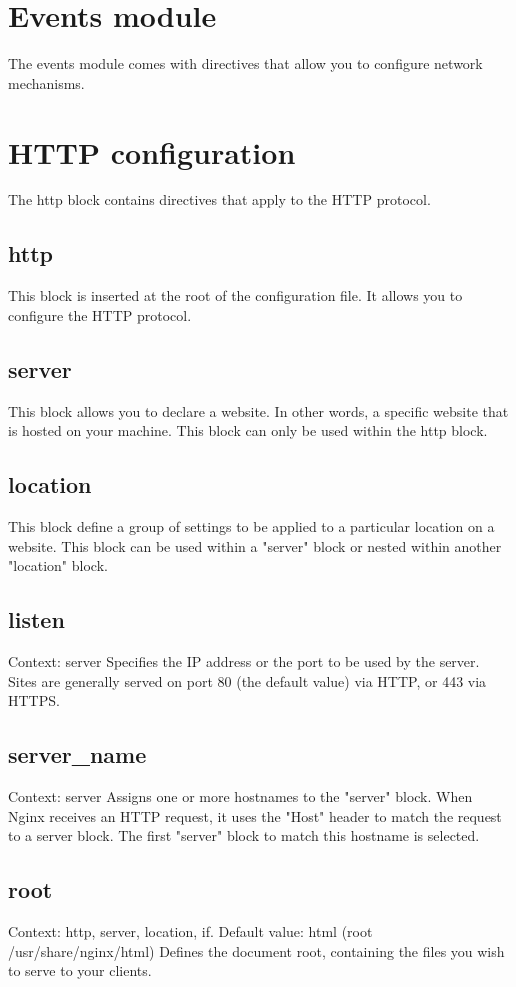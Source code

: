 \documentclass[12pt]{article}
\begin{document}
\section{Events module}
The events module comes with directives that allow you to configure network
mechanisms.

\section{HTTP configuration}
The http block contains directives that apply to the HTTP protocol.

\subsection{http}
This block is inserted at the root of the configuration file. It allows you to
configure the HTTP protocol.

\subsection{server}
This block allows you to declare a website. In other words, a specific
website that is hosted on your machine. This block can only be used within
the http block.

\subsection{location}
This block define a group of settings to be applied to a particular location
on a website. This block can be used within a "server" block or nested within
another "location" block.

\subsection{listen}
Context: server
Specifies the IP address or the port to be used by the server. Sites are
generally served on port 80 (the default value) via HTTP, or 443 via HTTPS.

\subsection{server_name}
Context: server
Assigns one or more hostnames to the "server" block. When Nginx receives an HTTP
request, it uses the "Host" header to match the request to a server block. The first
"server" block to match this hostname is selected.

\subsection{root}
Context: http, server, location, if.
Default value: html (root /usr/share/nginx/html)
Defines the document root, containing the files you wish to serve to your clients.
\end{document}
